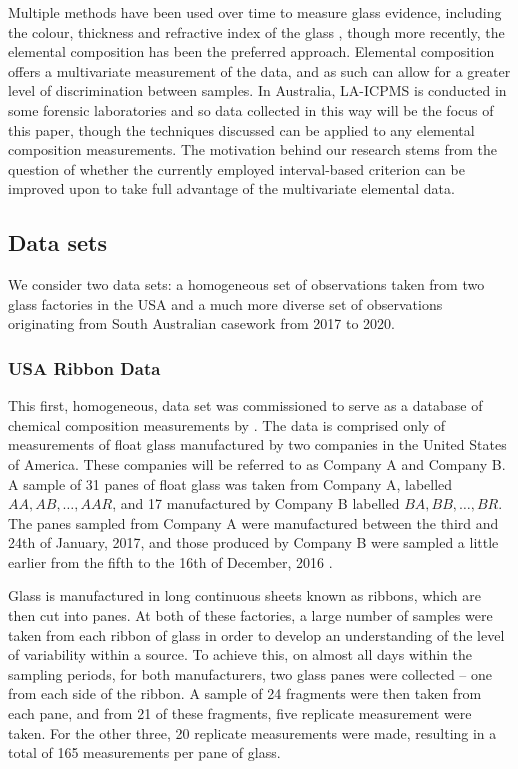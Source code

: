 \documentclass[a4paper]{article}
\begin{document}
Multiple methods have been used over time to measure glass evidence, including the colour, thickness and refractive index of the glass \citep{Curran2000}, though more recently, the elemental composition has been the preferred approach. Elemental composition offers a multivariate measurement of the data, and as such can allow for a greater level of discrimination between samples. In Australia, LA-ICPMS is conducted in some forensic laboratories and so data collected in this way will be the focus of this paper, though the techniques discussed can be applied to any elemental composition measurements. The motivation behind our research stems from the question of whether the currently employed interval-based criterion can be improved upon to take full advantage of the multivariate elemental data.

\subsection{Data sets}

We consider two data sets: a homogeneous set of observations taken from two glass factories in the USA and a much more diverse set of observations originating from South Australian casework from 2017 to 2020.

\subsubsection*{USA Ribbon Data}

This first, homogeneous, data set was commissioned to serve as a database of chemical composition measurements by \citet{Park2019}. The data is comprised only of measurements of float glass manufactured by two companies in the United States of America. These companies will be referred to as Company A and Company B. A sample of 31 panes of float glass was taken from Company A, labelled $AA, AB, \dots, AAR$, and 17 manufactured by Company B labelled $BA, BB, \dots, BR$. The panes sampled from Company A were manufactured between the third and 24th of January, 2017, and those produced by Company B were sampled a little earlier from the fifth to the 16th of December, 2016 \citep{Park2020}. 

Glass is manufactured in long continuous sheets known as ribbons, which are then cut into panes. At both of these factories, a large number of samples were taken from each ribbon of glass in order to develop an understanding of the level of variability within a source. To achieve this, on almost all days within the sampling periods, for both manufacturers, two glass panes were collected -- one from each side of the ribbon. A sample of 24 fragments were then taken from each pane, and from 21 of these fragments, five replicate measurement were taken. For the other three, 20 replicate measurements were made, resulting in a total of 165 measurements per pane of glass.
\end{document}
